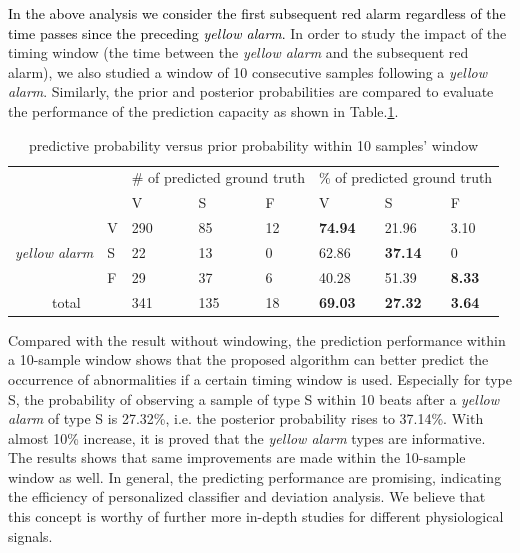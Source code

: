 \textcolor{black}{In the above analysis we consider the first subsequent red alarm regardless of the time passes since the preceding \textit{yellow alarm}.} In order to study the impact of the timing window (the time between the \textit{yellow alarm} and the subsequent red alarm), we also studied a window of 10 consecutive samples following a \textit{yellow alarm}. Similarly, the prior and posterior probabilities are compared to evaluate the performance of the prediction capacity as shown in Table.\ref{table:pred10}. %


\begin{table}[t]
\centering
\caption{predictive probability versus prior probability within 10 samples' window}
\label{table:pred10}
\begin{tabular}{|c|l|l|l|l||l|l|l|}
\hline
\multicolumn{2}{|l|}{\multirow{2}{*}{}} & \multicolumn{3}{l|}{\# of predicted ground truth} & \multicolumn{3}{l|}{\% of predicted ground truth} \\ \cline{3-8} 
\multicolumn{2}{|l|}{}                  & V               & S               & F             & V               & S               & F             \\ \hline
\multirow{3}{*}{\textit{yellow alarm}}    & V    & 290             & 85              & 12            & \textbf{74.94}  & 21.96           & 3.10          \\ \cline{2-8} 
                                 & S    & 22              & 13              & 0             & 62.86           & \textbf{37.14}  & 0             \\ \cline{2-8} 
                                 & F    & 29              & 37              & 6             & 40.28           & 51.39           & \textbf{8.33} \\ \hline
\multicolumn{2}{|c|}{total}             & 341             & 135             & 18            & \textbf{69.03}  & \textbf{27.32}  & \textbf{3.64} \\ \hline
\end{tabular}
\end{table}

Compared with the result without windowing, the prediction performance within a 10-sample window shows that the proposed algorithm can better predict the occurrence of abnormalities if a certain timing window is used. Especially for type S, the probability of observing a sample of type S within 10 beats after a \textit{yellow alarm} of type S is 27.32\%, %
i.e. the posterior probability rises to 37.14\%. With almost 10\% increase, it is proved that the \textit{yellow alarm} types are informative. The results shows that same improvements are made within the 10-sample window as well. In general, the predicting performance are promising, indicating the efficiency of personalized classifier and deviation analysis. We believe that this concept is worthy of further more in-depth studies for different physiological signals.




